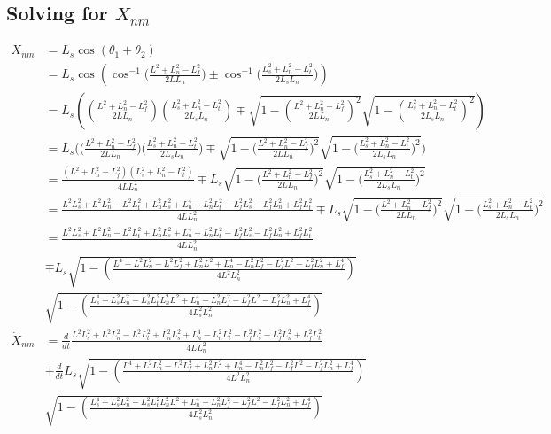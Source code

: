 \documentclass[11pt, landscape]{article}
\begin{document}
\subsection{Solving for $X_{nm}$}

\begin{align*}
  X_{nm} &= L_s\cos(\theta_1 + \theta_2)\\
  &= L_s\cos\left(\cos^{-1}\bigg(\frac{L^2+L_{n}^2-L_{f}^2}{2LL_{n}}\bigg) \pm\cos^{-1}\bigg(\frac{L_{s}^2+L_{n}^2-L_{t}^2}{2L_{s}L_{n}}\bigg)\right)\\
  &= L_s\left(\left(\frac{L^2+L_{n}^2-L_{f}^2}{2LL_{n}}\right)\left(\frac{L_{s}^2+L_{n}^2-L_{t}^2}{2L_{s}L_{n}}\right) \mp \sqrt{1-\left(\frac{L^2+L_{n}^2-L_{f}^2}{2LL_{n}}\right)^2}\sqrt{1-\left(\frac{L_{s}^2+L_{n}^2-L_{t}^2}{2L_{s}L_{n}}\right)^2}\right)\\
  &= L_{s}\Bigg( \Big(\frac{L^2+L_{n}^2-L_{f}^2}{2LL_{n}}\Big)\Big(\frac{L_{s}^2+L_{n}^2-L_{t}^2}{2L_{s}L_{n}}\Big) \mp \sqrt{1-\bigg(\frac{L^2+L_{n}^2-L_{f}^2}{2LL_{n}}\bigg)^2}\sqrt{1-\bigg(\frac{L_{s}^2+L_{n}^2-L_{t}^2}{2L_{s}L_{n}}\bigg)^2} \Bigg)\\
  &=  \frac{\left(L^2+L_{n}^2-L_{f}^2\right)\left(L_{s}^2+L_{n}^2-L_{t}^2\right)}{4LL_{n}^2}
  \mp L_s\sqrt{1-\bigg(\frac{L^2+L_{n}^2-L_{f}^2}{2LL_{n}}\bigg)^2}\sqrt{1-\bigg(\frac{L_{s}^2+L_{n}^2-L_{t}^2}{2L_{s}L_{n}}\bigg)^2}\\
  &= \frac{L^2L_s^2 + L^2L_n^2 - L^2L_t^2 + L_n^2L_s^2 + L_n^4 - L_n^2L_t^2 - L_f^2L_s^2 - L_f^2L_n^2 + L_f^2L_t^2}{4LL_{n}^2}
  \mp L_s\sqrt{1-\bigg(\frac{L^2+L_{n}^2-L_{f}^2}{2LL_{n}}\bigg)^2}\sqrt{1-\bigg(\frac{L_{s}^2+L_{n}^2-L_{t}^2}{2L_{s}L_{n}}\bigg)^2}\\
  &= \frac{L^2L_s^2 + L^2L_n^2 - L^2L_t^2 + L_n^2L_s^2 + L_n^4 - L_n^2L_t^2 - L_f^2L_s^2 - L_f^2L_n^2 + L_f^2L_t^2}{4LL_{n}^2}\\
  &\mp L_s\sqrt{1 - \left(\frac{L^4 + L^2L_n^2 - L^2L_f^2 + L_n^2L^2 + L_n^4 - L_n^2L_f^2 - L_f^2L^2 - L_f^2L_n^2 + L_f^4}{4L^2L_{n}^2}\right)}\\
  &\sqrt{1-\left(\frac{L_s^4 + L_s^2L_n^2 - L_s^2L_t^2 L_n^2L^2 + L_n^4 - L_n^2L_f^2 - L_f^2L^2 - L_f^2L_n^2 + L_f^4}{4L_{s}^2L_{n}^2}\right)}\\
  \dot{X}_{nm}  &= \frac{d}{dt}\frac{L^2L_s^2 + L^2L_n^2 - L^2L_t^2 + L_n^2L_s^2 + L_n^4 - L_n^2L_t^2 - L_f^2L_s^2 - L_f^2L_n^2 + L_f^2L_t^2}{4LL_{n}^2}\\
  &\mp \frac{d}{dt}L_s\sqrt{1 - \left(\frac{L^4 + L^2L_n^2 - L^2L_f^2 + L_n^2L^2 + L_n^4 - L_n^2L_f^2 - L_f^2L^2 - L_f^2L_n^2 + L_f^4}{4L^2L_{n}^2}\right)}\\
  &\sqrt{1-\left(\frac{L_s^4 + L_s^2L_n^2 - L_s^2L_t^2 L_n^2L^2 + L_n^4 - L_n^2L_f^2 - L_f^2L^2 - L_f^2L_n^2 + L_f^4}{4L_{s}^2L_{n}^2}\right)}\\
\end{align*}
\end{document}
